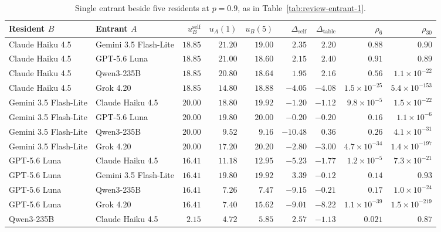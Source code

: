 \begin{table}[!htbp]
\caption{Single entrant beside five residents at $p=0.9$, as in Table~\ref{tab:review-entrant-1}.}
\label{tab:review-entrant-3}
\centering\small\setlength{\tabcolsep}{4pt}
\begin{tabular}{@{}llrrrrrrr@{}}
\toprule
Resident $B$ & Entrant $A$ & $u_B^{\mathrm{self}}$ & $u_A(1)$ & $u_B(5)$ & $\Delta_{\mathrm{self}}$ & $\Delta_{\mathrm{table}}$ & $\rho_6$ & $\rho_{30}$ \\
\midrule
Claude Haiku 4.5 & Gemini 3.5 Flash-Lite & $18.85$ & $21.20$ & $19.00$ & $2.35$ & $2.20$ & $0.88$ & $0.90$ \\
Claude Haiku 4.5 & GPT-5.6 Luna & $18.85$ & $21.00$ & $18.60$ & $2.15$ & $2.40$ & $0.91$ & $0.89$ \\
Claude Haiku 4.5 & Qwen3-235B & $18.85$ & $20.80$ & $18.64$ & $1.95$ & $2.16$ & $0.56$ & $1.1\times10^{-22}$ \\
Claude Haiku 4.5 & Grok 4.20 & $18.85$ & $14.80$ & $18.88$ & $-4.05$ & $-4.08$ & $1.5\times10^{-25}$ & $5.4\times10^{-153}$ \\
\addlinespace[2pt]
Gemini 3.5 Flash-Lite & Claude Haiku 4.5 & $20.00$ & $18.80$ & $19.92$ & $-1.20$ & $-1.12$ & $9.8\times10^{-5}$ & $1.5\times10^{-22}$ \\
Gemini 3.5 Flash-Lite & GPT-5.6 Luna & $20.00$ & $19.80$ & $20.00$ & $-0.20$ & $-0.20$ & $0.16$ & $1.1\times10^{-6}$ \\
Gemini 3.5 Flash-Lite & Qwen3-235B & $20.00$ & $9.52$ & $9.16$ & $-10.48$ & $0.36$ & $0.26$ & $4.1\times10^{-31}$ \\
Gemini 3.5 Flash-Lite & Grok 4.20 & $20.00$ & $17.20$ & $20.20$ & $-2.80$ & $-3.00$ & $4.7\times10^{-34}$ & $1.4\times10^{-197}$ \\
\addlinespace[2pt]
GPT-5.6 Luna & Claude Haiku 4.5 & $16.41$ & $11.18$ & $12.95$ & $-5.23$ & $-1.77$ & $1.2\times10^{-5}$ & $7.3\times10^{-21}$ \\
GPT-5.6 Luna & Gemini 3.5 Flash-Lite & $16.41$ & $19.80$ & $19.92$ & $3.39$ & $-0.12$ & $0.14$ & $0.93$ \\
GPT-5.6 Luna & Qwen3-235B & $16.41$ & $7.26$ & $7.47$ & $-9.15$ & $-0.21$ & $0.17$ & $1.0\times10^{-24}$ \\
GPT-5.6 Luna & Grok 4.20 & $16.41$ & $7.40$ & $15.62$ & $-9.01$ & $-8.22$ & $1.1\times10^{-39}$ & $1.5\times10^{-219}$ \\
\addlinespace[2pt]
Qwen3-235B & Claude Haiku 4.5 & $2.15$ & $4.72$ & $5.85$ & $2.57$ & $-1.13$ & $0.021$ & $0.87$ \\

\end{tabular}
\end{table}
